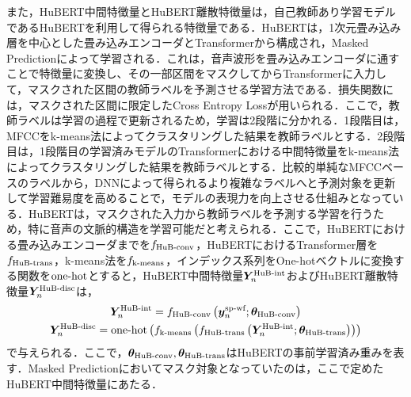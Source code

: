 また，HuBERT中間特徴量とHuBERT離散特徴量は，自己教師あり学習モデルであるHuBERTを利用して得られる特徴量である．HuBERTは，1次元畳み込み層を中心とした畳み込みエンコーダとTransformerから構成され，Masked Predictionによって学習される．これは，音声波形を畳み込みエンコーダに通すことで特徴量に変換し、その一部区間をマスクしてからTransformerに入力して，マスクされた区間の教師ラベルを予測させる学習方法である．損失関数には，マスクされた区間に限定したCross Entropy Lossが用いられる．ここで，教師ラベルは学習の過程で更新されるため，学習は2段階に分かれる．1段階目は，MFCCをk-means法によってクラスタリングした結果を教師ラベルとする．2段階目は，1段階目の学習済みモデルのTransformerにおける中間特徴量をk-means法によってクラスタリングした結果を教師ラベルとする．比較的単純なMFCCベースのラベルから，DNNによって得られるより複雑なラベルへと予測対象を更新して学習難易度を高めることで，モデルの表現力を向上させる仕組みとなっている．HuBERTは，マスクされた入力から教師ラベルを予測する学習を行うため，特に音声の文脈的構造を学習可能だと考えられる．ここで，HuBERTにおける畳み込みエンコーダまでを$f_{\text{HuB-conv}}$，HuBERTにおけるTransformer層を$f_{\text{HuB-trans}}$，k-means法を$f_{\text{k-means}}$，インデックス系列をOne-hotベクトルに変換する関数を$\text{one-hot}$とすると，HuBERT中間特徴量$\bm{Y}^{\text{HuB-int}}_{n}$およびHuBERT離散特徴量$\bm{Y}^{\text{HuB-disc}}_{n}$は，
\begin{gather}
    \bm{Y}^{\text{HuB-int}}_{n} = f_{\text{HuB-conv}}\left(\bm{y}^{\text{sp-wf}}_{n}; \bm{\theta}_{\text{HuB-conv}}\right) \\
    \bm{Y}^{\text{HuB-disc}}_{n} = \text{one-hot}\left(f_{\text{k-means}}\left(f_{\text{HuB-trans}}\left(\bm{Y}^{\text{HuB-int}}_{n}; \bm{\theta}_{\text{HuB-trans}}\right)\right)\right)
\end{gather}
で与えられる．ここで，$\bm{\theta}_{\text{HuB-conv}}, \bm{\theta}_{\text{HuB-trans}}$はHuBERTの事前学習済み重みを表す．Masked Predictionにおいてマスク対象となっていたのは，ここで定めたHuBERT中間特徴量にあたる．


